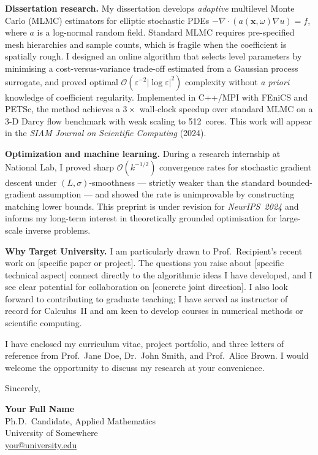\documentclass[10pt,letterpaper]{article}
\begin{document}
\textbf{Dissertation research.}\enspace
My dissertation develops \emph{adaptive} multilevel Monte Carlo (MLMC)
estimators for elliptic stochastic PDEs
\(-\nabla\cdot(a(\mathbf{x},\omega)\nabla u)=f\),
where \(a\) is a log-normal random field.
Standard MLMC requires pre-specified mesh hierarchies and sample counts,
which is fragile when the coefficient is spatially rough.
I designed an online algorithm that selects level parameters by minimising
a cost-versus-variance trade-off estimated from a Gaussian process
surrogate, and proved optimal \(\mathcal{O}(\varepsilon^{-2}|\log\varepsilon|^2)\)
complexity without \emph{a priori} knowledge of coefficient regularity.
Implemented in C++/MPI with FEniCS and PETSc, the method achieves a
\(3\times\) wall-clock speedup over standard MLMC on a 3-D Darcy flow
benchmark with weak scaling to 512~cores.
This work will appear in the \textit{SIAM Journal on Scientific Computing}
(2024).

\textbf{Optimization and machine learning.}\enspace
During a research internship at National Lab, I proved sharp
\(\mathcal{O}(k^{-1/2})\) convergence rates for stochastic gradient
descent under \((L,\sigma)\)-smoothness — strictly weaker than the
standard bounded-gradient assumption — and showed the rate is
unimprovable by constructing matching lower bounds.
This preprint is under revision for \textit{NeurIPS~2024} and informs
my long-term interest in theoretically grounded optimisation for
large-scale inverse problems.

\textbf{Why Target University.}\enspace %
I am particularly drawn to Prof.\ Recipient's recent work on [specific
paper or project].
The questions you raise about [specific technical aspect] connect
directly to the algorithmic ideas I have developed, and I see clear
potential for collaboration on [concrete joint direction].
I also look forward to contributing to graduate teaching; I have served
as instructor of record for Calculus~II and am keen to develop courses
in numerical methods or scientific computing.

I have enclosed my curriculum vitae, project portfolio, and three
letters of reference from Prof.\ Jane Doe, Dr.\ John Smith, and
Prof.\ Alice Brown.
I would welcome the opportunity to discuss my research at your
convenience.

\vspace{10pt}
Sincerely,

\vspace{22pt}
{\bfseries\color{NavyDeep} Your Full Name}\\  %
{\small\color{SubtleGray}
  Ph.D.\ Candidate, Applied Mathematics\\
  University of Somewhere\\
  \href{mailto:you@university.edu}{you@university.edu}%
}
\end{document}
